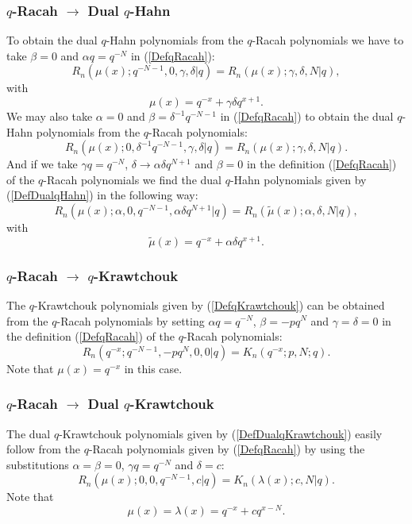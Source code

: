 \documentclass[envcountchap,graybox]{svmono}
\newcounter{rom}
\begin{document}
\subsubsection*{$q$-Racah $\rightarrow$ Dual $q$-Hahn}
To obtain the dual $q$-Hahn polynomials from the $q$-Racah polynomials we have to
take $\beta=0$ and $\alpha q=q^{-N}$ in (\ref{DefqRacah}):
\begin{equation}
R_n(\mu(x);q^{-N-1},0,\gamma,\delta|q)=R_n(\mu(x);\gamma,\delta,N|q),
\end{equation}
with
$$\mu(x)=q^{-x}+\gamma\delta q^{x+1}.$$
We may also take $\alpha=0$ and $\beta=\delta^{-1}q^{-N-1}$ in (\ref{DefqRacah}) to obtain
the dual $q$-Hahn polynomials from the $q$-Racah polynomials:
\begin{equation}
R_n(\mu(x);0,\delta^{-1}q^{-N-1},\gamma,\delta|q)=R_n(\mu(x);\gamma,\delta,N|q).
\end{equation}
And if we take $\gamma q=q^{-N}$, $\delta\rightarrow\alpha\delta q^{N+1}$ and $\beta=0$ in the
definition (\ref{DefqRacah}) of the $q$-Racah polynomials we find the dual
$q$-Hahn polynomials given by (\ref{DefDualqHahn}) in the following way:
\begin{equation}
R_n(\mu(x);\alpha,0,q^{-N-1},\alpha\delta q^{N+1}|q)=R_n({\tilde \mu}(x);\alpha,\delta,N|q),
\end{equation}
with
$${\tilde \mu}(x)=q^{-x}+\alpha\delta q^{x+1}.$$

\subsubsection*{$q$-Racah $\rightarrow$ $q$-Krawtchouk}
The $q$-Krawtchouk polynomials given by (\ref{DefqKrawtchouk}) can be obtained from
the $q$-Racah polynomials by setting $\alpha q=q^{-N}$, $\beta=-pq^N$ and
$\gamma=\delta=0$ in the definition (\ref{DefqRacah}) of the $q$-Racah polynomials:
\begin{equation}
R_n(q^{-x};q^{-N-1},-pq^N,0,0|q)=K_n(q^{-x};p,N;q).
\end{equation}
Note that $\mu(x)=q^{-x}$ in this case.

\subsubsection*{$q$-Racah $\rightarrow$ Dual $q$-Krawtchouk}
The dual $q$-Krawtchouk polynomials given by (\ref{DefDualqKrawtchouk}) easily
follow from the $q$-Racah polynomials given by (\ref{DefqRacah}) by using the
substitutions $\alpha=\beta=0$, $\gamma q=q^{-N}$ and $\delta=c$:
\begin{equation}
R_n(\mu(x);0,0,q^{-N-1},c|q)=K_n(\lambda(x);c,N|q).
\end{equation}
Note that
$$\mu(x)=\lambda(x)=q^{-x}+cq^{x-N}.$$
\end{document}
